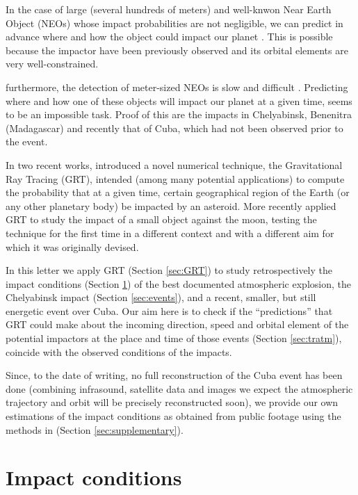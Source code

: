 \documentclass[fleqn,usenatbib]{mnras}
\renewcommand{\check}[1]{\textcolor{red}{#1}}
\begin{document}
In the case of large (several hundreds of meters) and well-knwon Near Earth Object (NEOs) whose impact probabilities are not negligible, we can predict in advance where and how the object could impact our planet \citep{Chapman2004, Chesley2005,Rumpf2015}. This is possible because the impactor have been previously observed and its orbital elements are very well-constrained.


furthermore, the detection of meter-sized NEOs is slow and difficult \citep{Boslough2015}. Predicting where and how one of these objects will impact our planet at a given time, seems to be an impossible task. Proof of this are the impacts in Chelyabinsk, Benenitra (Madagascar) and recently that of Cuba, which had not been observed prior to the event.

In two recent works, \citet{Zuluaga2017p,Zuluaga2018} introduced a novel numerical technique, the Gravitational Ray Tracing (GRT), intended (among many potential applications) to  compute the probability that at a given time, certain geographical region of the Earth (or any other planetary body) be impacted by an asteroid.  More recently \citet{Zuluaga2019} applied GRT to study the impact of a small object against the moon, testing the technique for the first time in a different context and with a different aim for which it was originally devised.

In this letter we apply GRT (Section \ref{sec:GRT}) to study retrospectively the impact conditions (Section \ref{sec:conditions}) of the best documented atmospheric explosion, the Chelyabinsk impact (Section \ref{sec:events}), and a recent,  smaller, but still energetic event over Cuba.  Our aim here is to check if the ``predictions'' that GRT could make about the incoming direction, speed and orbital element of the potential impactors at the place and time of those events (Section \ref{sec:tratm}), coincide with the observed conditions of the impacts.  

Since, to the date of writing, no full reconstruction of the Cuba event has been done (combining infrasound, satellite data and images we expect the atmospheric trajectory and orbit will be precisely reconstructed soon), we provide our own estimations of the impact conditions as obtained from public footage using the methods in \citealt{Zuluaga2013} (Section \ref{sec:supplementary}).

\section{Impact conditions}
\label{sec:conditions}
\end{document}
